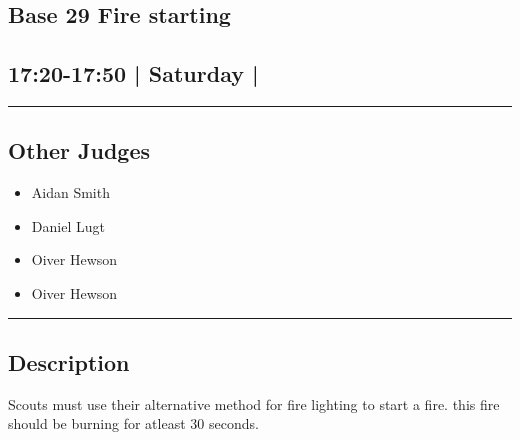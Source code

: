 \documentclass[10pt, A5]{article}
\begin{document}
	

		\begin{framed}
			\begin{minipage}{\textwidth}

			\setcounter{section}{63}
							\section{\faStar \: Base 29 \faStar \: Fire starting}
						
			\subsection*{17:20-17:50 | Saturday | }

			\vspace{0.25cm}
			\hrule
			\vspace{0.25cm}


			\subsection*{Other Judges}
							

				\begin{multicols}{2}

			\begin{itemize}
											\item Aidan Smith
											\item Daniel Lugt
											\item Oiver Hewson
								\end{itemize}

			\vfill\null
			\columnbreak

			\begin{itemize}
											\item Oiver Hewson
								\end{itemize}

			\vfill\null

			\end{multicols}

			\vspace{0.25cm}
			\hrule
			\vspace{0.25cm}

			\begin{minipage}{\textwidth}
			\subsection*{\faListAlt \: Description}
			Scouts must use their alternative method for fire lighting to start a fire. this fire should be burning for atleast 30 seconds.
			\end{minipage}


	\end{minipage}
	\end{framed}
\end{document}
